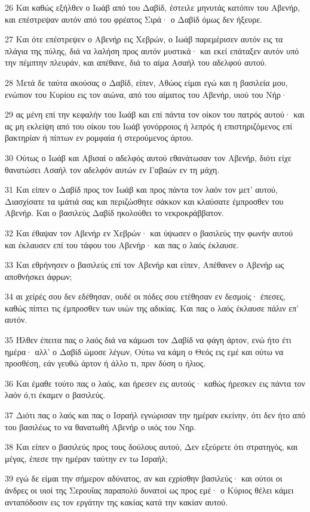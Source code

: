 \par 26 Και καθώς εξήλθεν ο Ιωάβ από του Δαβίδ, έστειλε μηνυτάς κατόπιν του Αβενήρ, και επέστρεψαν αυτόν από του φρέατος Σιρά· ο Δαβίδ όμως δεν ήξευρε.
\par 27 Και ότε επέστρεψεν ο Αβενήρ εις Χεβρών, ο Ιωάβ παρεμέρισεν αυτόν εις τα πλάγια της πύλης, διά να λαλήση προς αυτόν μυστικά· και εκεί επάταξεν αυτόν υπό την πέμπτην πλευράν, και απέθανε, διά το αίμα Ασαήλ του αδελφού αυτού.
\par 28 Μετά δε ταύτα ακούσας ο Δαβίδ, είπεν, Αθώος είμαι εγώ και η βασιλεία μου, ενώπιον του Κυρίου εις τον αιώνα, από του αίματος του Αβενήρ, υιού του Νήρ·
\par 29 ας μένη επί την κεφαλήν του Ιωάβ και επί πάντα τον οίκον του πατρός αυτού· και ας μη εκλείψη από του οίκου του Ιωάβ γονόρροιος ή λεπρός ή επιστηριζόμενος επί βακτηρίαν ή πίπτων εν ρομφαία ή στερούμενος άρτου.
\par 30 Ούτως ο Ιωάβ και Αβισαί ο αδελφός αυτού εθανάτωσαν τον Αβενήρ, διότι είχε θανατώσει Ασαήλ τον αδελφόν αυτών εν Γαβαών εν τη μάχη.
\par 31 Και είπεν ο Δαβίδ προς τον Ιωάβ και προς πάντα τον λαόν τον μετ' αυτού, Διασχίσατε τα ιμάτιά σας και περιζώσθητε σάκκον και κλαύσατε έμπροσθεν του Αβενήρ. Και ο βασιλεύς Δαβίδ ηκολούθει το νεκροκράββατον.
\par 32 Και έθαψαν τον Αβενήρ εν Χεβρών· και ύψωσεν ο βασιλεύς την φωνήν αυτού και έκλαυσεν επί του τάφου του Αβενήρ· και πας ο λαός έκλαυσε.
\par 33 Και εθρήνησεν ο βασιλεύς επί τον Αβενήρ και είπεν, Απέθανεν ο Αβενήρ ως αποθνήσκει άφρων;
\par 34 αι χείρές σου δεν εδέθησαν, ουδέ οι πόδες σου ετέθησαν εν δεσμοίς· έπεσες, καθώς πίπτει τις έμπροσθεν των υιών της αδικίας. Και πας ο λαός έκλαυσε πάλιν επ' αυτόν.
\par 35 Ήλθεν έπειτα πας ο λαός διά να κάμωσι τον Δαβίδ να φάγη άρτον, ενώ ήτο έτι ημέρα· αλλ' ο Δαβίδ ώμοσε λέγων, Ούτω να κάμη ο Θεός εις εμέ και ούτω να προσθέση, εάν γευθώ άρτον ή άλλο τι, πριν δύση ο ήλιος.
\par 36 Και έμαθε τούτο πας ο λαός, και ήρεσεν εις αυτούς· καθώς ήρεσκεν εις πάντα τον λαόν ό,τι έκαμεν ο βασιλεύς.
\par 37 Διότι πας ο λαός και πας ο Ισραήλ εγνώρισαν την ημέραν εκείνην, ότι δεν ήτο από του βασιλέως το να θανατωθή Αβενήρ ο υιός του Νηρ.
\par 38 Και είπεν ο βασιλεύς προς τους δούλους αυτού, Δεν εξεύρετε ότι στρατηγός, και μέγας, έπεσε την ημέραν ταύτην εν τω Ισραήλ;
\par 39 εγώ δε είμαι την σήμερον αδύνατος, αν και εχρίσθην βασιλεύς· και ούτοι οι άνδρες οι υιοί της Σερουΐας παραπολύ δυνατοί ως προς εμέ· ο Κύριος θέλει κάμει ανταπόδοσιν εις τον εργάτην της κακίας κατά την κακίαν αυτού.

